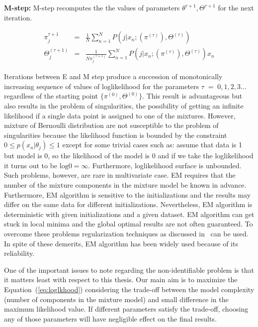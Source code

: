 \textbf{M-step:} M-step recomputes the the values of parameters {$\theta ^{\tau+1}, \Theta ^{\tau+1}$} for the next iteration.

\begin{eqnarray}
\label{eq:mstep1}
\pi_{j}^{\tau+1} & = & \frac{1}{N} \displaystyle \sum _{n=1}^N P(j|x_n;(\pi^{(\tau)}),\Theta^{(\tau)}) \nonumber \\
\Theta_{j}^{(\tau+1)} & = & \frac{1}{N \pi_{j}^{(\tau+1)}} \displaystyle \sum _{n=1}^N P(j|x_n;(\pi^{(\tau)}),\Theta^{(\tau)})x_n 
\end{eqnarray}

Iterations between E and M step produce a succession of monotonically increasing sequence of values of loglikelihood for the parameters $\tau\;=\;0,1,2,3\ldots$ regardless of the starting point $\{\pi^{(0)},\Theta^{(0)}\}$. This result is advantageous but also results in the problem of singularities, the possibility of getting an infinite likelihood if a single data point is assigned to one of the mixtures. However, mixture of Bernoulli distribution are not susceptible to the problem of singularities because the likelihood function is bounded by the constraint $0\leq p(x_n|\theta_j) \leq 1$ except for some trivial cases such as: assume that data is 1 but model is 0, so the likelihood of the model is 0 and if we take the loglikelihood it turns out to be $\mathrm{log} 0 = \infty $. Furthermore, loglikelihood surface is unbounded. Such problems, however, are rare in multivariate case. EM requires that the number of the mixture components in the mixture model be known in advance. Furthermore, EM algorithm is sensitive to the initializations and the results may differ on the same data for different initializations. Nevertheless, EM algorithm is deterministic with given initializations and a given dataset. EM algorithm can get stuck in local minima and the global optimal results are not often guaranteed. To overcome these problems regularization techniques as discussed in~\cite{regularization} can be used. In spite of these demerits, EM algorithm has been widely used because of its reliability.

One of the important issues to note regarding the non-identifiable problem is that it matters least with respect to this thesis. Our main aim is to maximize the Equation~(\ref{eq:loglkhood}) considering the trade-off between the model complexity (number of components in the mixture model) and small difference in the maximum likelihood value. If different parameters satisfy the trade-off, choosing any of those parameters will have negligible effect on the final results. 

